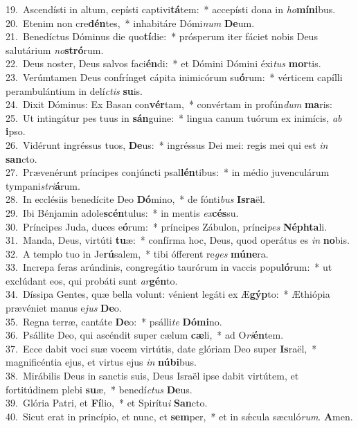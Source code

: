 {19.~}Ascendísti in altum, cepísti captivi\textbf{tá}tem:~* accepísti dona in \textit{ho}\textbf{mí}\textbf{ni}bus.\\
{20.~}Etenim non cre\textbf{dén}tes,~* inhabitáre Dómi\textit{num} \textbf{De}um.\\
{21.~}Benedíctus Dóminus die quo\textbf{tí}die:~* prósperum iter fáciet nobis Deus salutárium \textit{no}\textbf{stró}rum.\\
{22.~}Deus noster, Deus salvos faci\textbf{én}di:~* et Dómini Dómini éxi\textit{tus} \textbf{mor}tis.\\
{23.~}Verúmtamen Deus confrínget cápita inimicórum su\textbf{ó}rum:~* vérticem capílli perambulántium in delí\textit{ctis} \textbf{su}is.\\
{24.~}Dixit Dóminus: Ex Basan con\textbf{vér}tam,~* convértam in profún\textit{dum} \textbf{ma}ris:\\
{25.~}Ut intingátur pes tuus in \textbf{sán}guine:~* lingua canum tuórum ex inimícis, \textit{ab} \textbf{i}pso.\\
{26.~}Vidérunt ingréssus tuos, \textbf{De}us:~* ingréssus Dei mei: regis mei qui est \textit{in} \textbf{san}cto.\\
{27.~}Prævenérunt príncipes conjúncti psal\textbf{lén}tibus:~* in médio juvenculárum tympani\textit{stri}\textbf{á}rum.\\
{28.~}In ecclésiis benedícite Deo \textbf{Dó}mino,~* de fónti\textit{bus} \textbf{Is}\textbf{ra}ël.\\
{29.~}Ibi Bénjamin adole\textbf{scén}tulus:~* in mentis \textit{ex}\textbf{cés}su.\\
{30.~}Príncipes Juda, duces e\textbf{ó}rum:~* príncipes Zábulon, prínci\textit{pes} \textbf{Né}\textbf{phta}li.\\
{31.~}Manda, Deus, virtúti \textbf{tu}æ:~* confírma hoc, Deus, quod operátus es \textit{in} \textbf{no}bis.\\
{32.~}A templo tuo in Je\textbf{rú}salem,~* tibi ófferent re\textit{ges} \textbf{mú}\textbf{ne}ra.\\
{33.~}Increpa feras arúndinis, congregátio taurórum in vaccis popu\textbf{ló}rum:~* ut exclúdant eos, qui probáti sunt \textit{ar}\textbf{gén}to.\\
{34.~}Díssipa Gentes, quæ bella volunt: vénient legáti ex Æ\textbf{gýp}to:~* Æthiópia prævéniet manus e\textit{jus} \textbf{De}o.\\
{35.~}Regna terræ, cantáte \textbf{De}o:~* psálli\textit{te} \textbf{Dó}\textbf{mi}no.\\
{36.~}Psállite Deo, qui ascéndit super cælum \textbf{cæ}li,~* ad O\textit{ri}\textbf{én}tem.\\
{37.~}Ecce dabit voci suæ vocem virtútis, date glóriam Deo super \textbf{Is}raël,~* magnificéntia ejus, et virtus ejus \textit{in} \textbf{nú}\textbf{bi}bus.\\
{38.~}Mirábilis Deus in sanctis suis, Deus Israël ipse dabit virtútem, et fortitúdinem plebi \textbf{su}æ,~* benedí\textit{ctus} \textbf{De}us.\\
{39.~}Glória Patri, et \textbf{Fí}lio,~* et Spirítu\textit{i} \textbf{San}cto.\\
{40.~}Sicut erat in princípio, et nunc, et \textbf{sem}per,~* et in sǽcula sæculó\textit{rum}. \textbf{A}men.\\
